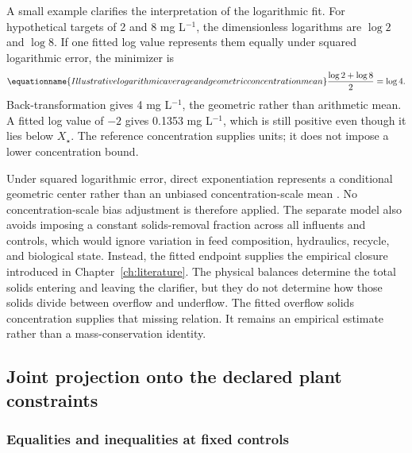 A small example clarifies the interpretation of the logarithmic fit. For hypothetical targets of 2 and 8 mg L$^{-1}$, the dimensionless logarithms are $\log2$ and $\log8$. If one fitted log value represents them equally under squared logarithmic error, the minimizer is
\begin{equation}
\equationname{Illustrative logarithmic average and geometric concentration mean}
\frac{\log2+\log8}{2}=\log4.
\end{equation}
Back-transformation gives 4 mg L$^{-1}$, the geometric rather than arithmetic mean. A fitted log value of $-2$ gives 0.1353 mg L$^{-1}$, which is still positive even though it lies below $X_\star$. The reference concentration supplies units; it does not impose a lower concentration bound.

Under squared logarithmic error, direct exponentiation represents a conditional geometric center rather than an unbiased concentration-scale mean \citep{Tofallis2015}. No concentration-scale bias adjustment is therefore applied. The separate model also avoids imposing a constant solids-removal fraction across all influents and controls, which would ignore variation in feed composition, hydraulics, recycle, and biological state. Instead, the fitted endpoint supplies the empirical closure introduced in Chapter~\ref{ch:literature}. The physical balances determine the total solids entering and leaving the clarifier, but they do not determine how those solids divide between overflow and underflow. The fitted overflow solids concentration supplies that missing relation. It remains an empirical estimate rather than a mass-conservation identity.

\subsection{Joint projection onto the declared plant constraints}

\subsubsection{Equalities and inequalities at fixed controls}

